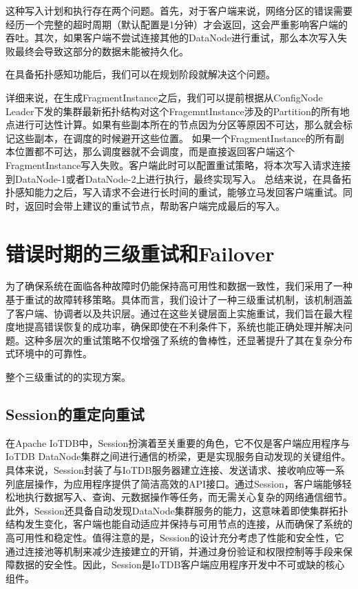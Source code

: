 这种写入计划和执行存在两个问题。首先，对于客户端来说，网络分区的错误需要经历一个完整的超时周期（默认配置是1分钟）才会返回，这会严重影响客户端的吞吐。其次，如果客户端不尝试连接其他的DataNode进行重试，那么本次写入失败最终会导致这部分的数据未能被持久化。


在具备拓扑感知功能后，我们可以在规划阶段就解决这个问题。

详细来说，在生成FragmentInstance之后，我们可以提前根据从ConfigNode Leader下发的集群最新拓扑结构对这个FragemntInstance涉及的Partition的所有地点进行可达性计算。如果有些副本所在的节点因为分区等原因不可达，那么就会标记这些副本，在调度的时候避开这些位置。
如果一个FragmentInstance的所有副本位置都不可达，那么调度器就不会调度，而是直接返回客户端这个FragmentInstance写入失败。客户端此时可以配置重试策略，将本次写入请求连接到DataNode-1或者DataNode-2上进行执行，最终实现写入。
总结来说，在具备拓扑感知能力之后，写入请求不会进行长时间的重试，能够立马发回客户端重试。同时，返回时会带上建议的重试节点，帮助客户端完成最后的写入。





\section{错误时期的三级重试和Failover}

为了确保系统在面临各种故障时仍能保持高可用性和数据一致性，我们采用了一种基于重试的故障转移策略。具体而言，我们设计了一种三级重试机制，该机制涵盖了客户端、协调者以及共识层。通过在这些关键层面上实施重试，我们旨在最大程度地提高错误恢复的成功率，确保即使在不利条件下，系统也能正确处理并解决问题。这种多层次的重试策略不仅增强了系统的鲁棒性，还显著提升了其在复杂分布式环境中的可靠性。

整个三级重试的的实现方案。

\subsection{Session的重定向重试}

在Apache IoTDB中，Session扮演着至关重要的角色，它不仅是客户端应用程序与IoTDB DataNode集群之间进行通信的桥梁，更是实现服务自动发现的关键组件。具体来说，Session封装了与IoTDB服务器建立连接、发送请求、接收响应等一系列底层操作，为应用程序提供了简洁高效的API接口。通过Session，客户端能够轻松地执行数据写入、查询、元数据操作等任务，而无需关心复杂的网络通信细节。此外，Session还具备自动发现DataNode集群服务的能力，这意味着即使集群拓扑结构发生变化，客户端也能自动适应并保持与可用节点的连接，从而确保了系统的高可用性和稳定性。值得注意的是，Session的设计充分考虑了性能和安全性，它通过连接池等机制来减少连接建立的开销，并通过身份验证和权限控制等手段来保障数据的安全性。因此，Session是IoTDB客户端应用程序开发中不可或缺的核心组件。

